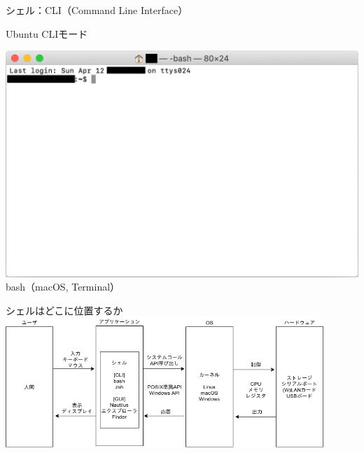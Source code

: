 \documentclass[12pt,aspectratio=169]{beamer}
\begin{document}
\begin{frame}{シェル：CLI（Command Line Interface）}
\begin{minipage}{0.3\textwidth}
    Ubuntu CLIモード
  \end{minipage}
  \hfill
  \begin{minipage}{0.3\textwidth}
    \vspace{-5\baselineskip}
    \includegraphics[width=2.0\linewidth,bb=0 0 1144 735]{./images/mac-basic.png}
    bash（macOS, Terminal）
  \end{minipage}

\end{frame}

\begin{frame}{シェルはどこに位置するか}
  \centering
  \includegraphics[width=12cm,bb=0 0 741 281]{./images/shell.png}

\end{frame}
\end{document}
